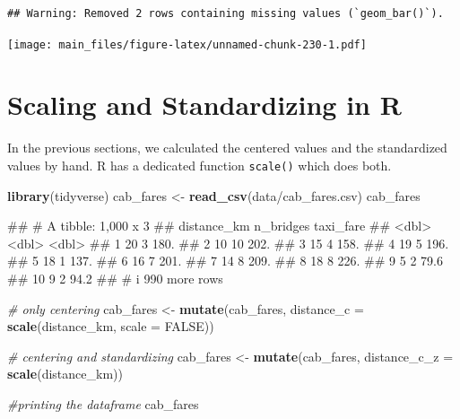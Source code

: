 \documentclass[
]{book}
\newenvironment{Shaded}{\begin{snugshade}}{\end{snugshade}}
\newcommand{\AttributeTok}[1]{\textcolor[rgb]{0.13,0.29,0.53}{#1}}
\newcommand{\CommentTok}[1]{\textcolor[rgb]{0.56,0.35,0.01}{\textit{#1}}}
\newcommand{\ConstantTok}[1]{\textcolor[rgb]{0.56,0.35,0.01}{#1}}
\newcommand{\FunctionTok}[1]{\textcolor[rgb]{0.13,0.29,0.53}{\textbf{#1}}}
\newcommand{\NormalTok}[1]{#1}
\newcommand{\OtherTok}[1]{\textcolor[rgb]{0.56,0.35,0.01}{#1}}
\newcommand{\StringTok}[1]{\textcolor[rgb]{0.31,0.60,0.02}{#1}}
\begin{document}
\begin{verbatim}
## Warning: Removed 2 rows containing missing values (`geom_bar()`).
\end{verbatim}

\texttt{[image: main\_files/figure-latex/unnamed-chunk-230-1.pdf]}

\section{Scaling and Standardizing in R}\label{scaling-and-standardizing-in-r}

In the previous sections, we calculated the centered values and the standardized values by hand. R has a dedicated function \texttt{scale()} which does both.

\begin{Shaded}
\begin{Highlighting}[]
\FunctionTok{library}\NormalTok{(tidyverse)}
\NormalTok{cab\_fares }\OtherTok{\textless{}{-}} \FunctionTok{read\_csv}\NormalTok{(}\StringTok{\textquotesingle{}data/cab\_fares.csv\textquotesingle{}}\NormalTok{)}
\NormalTok{cab\_fares}
\end{Highlighting}
\end{Shaded}

\begin{Shaded}
\begin{Highlighting}[]
\NormalTok{\#\# \# A tibble: 1,000 x 3}
\NormalTok{\#\#    distance\_km n\_bridges taxi\_fare}
\NormalTok{\#\#          \textless{}dbl\textgreater{}     \textless{}dbl\textgreater{}     \textless{}dbl\textgreater{}}
\NormalTok{\#\#  1          20         3     180. }
\NormalTok{\#\#  2          10        10     202. }
\NormalTok{\#\#  3          15         4     158. }
\NormalTok{\#\#  4          19         5     196. }
\NormalTok{\#\#  5          18         1     137. }
\NormalTok{\#\#  6          16         7     201. }
\NormalTok{\#\#  7          14         8     209. }
\NormalTok{\#\#  8          18         8     226. }
\NormalTok{\#\#  9           5         2      79.6}
\NormalTok{\#\# 10           9         2      94.2}
\NormalTok{\#\# \# i 990 more rows}
\end{Highlighting}
\end{Shaded}

\begin{Shaded}
\begin{Highlighting}[]
\CommentTok{\# only centering}
\NormalTok{cab\_fares }\OtherTok{\textless{}{-}} \FunctionTok{mutate}\NormalTok{(cab\_fares, }\AttributeTok{distance\_c =} \FunctionTok{scale}\NormalTok{(distance\_km, }\AttributeTok{scale =} \ConstantTok{FALSE}\NormalTok{))}

\CommentTok{\# centering and standardizing}
\NormalTok{cab\_fares }\OtherTok{\textless{}{-}} \FunctionTok{mutate}\NormalTok{(cab\_fares, }\AttributeTok{distance\_c\_z =} \FunctionTok{scale}\NormalTok{(distance\_km))}

\CommentTok{\#printing the dataframe}
\NormalTok{cab\_fares}
\end{Highlighting}
\end{Shaded}
\end{document}
